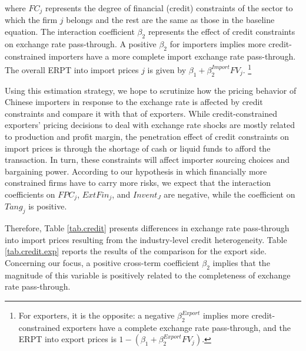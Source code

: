 where $FC_{j}$ represents the degree of financial (credit) constraints of the sector to which the firm $j$ belongs and the rest are the same as those in the baseline equation. The interaction coefficient $\beta_2$ represents the effect of credit constraints on exchange rate pass-through. A positive $\beta_2$ for importers implies more credit-constrained importers have a more complete import exchange rate pass-through. The overall ERPT into import prices $j$ is given by $\beta_{1} +\beta^{Import}_{2} FV_j$. \footnote{For exporters, it is the opposite: a negative $\beta^{Export}_2$ implies more credit-constrained exporters have a complete exchange rate pass-through, and the ERPT into export prices is $1-(\beta_{1} +\beta^{Export}_{2} FV_j)$.}

Using this estimation strategy, we hope to scrutinize how the pricing behavior of Chinese importers in response to the exchange rate is affected by credit constraints and compare it with that of exporters. While credit-constrained exporters’ pricing decisions to deal with exchange rate shocks are mostly related to production and profit margin, the penetration effect of credit constraints on import prices is through the shortage of cash or liquid funds to afford the transaction. In turn, these constraints will affect importer sourcing choices and bargaining power. According to our hypothesis in which financially more constrained firms have to carry more risks, we expect that the interaction coefficients on $FPC_{j}$, $ExtFin_j$, and $Invent_J$ are negative, while the coefficient on $Tang_j$ is positive.

Therefore, Table \ref{tab.credit} presents differences in exchange rate pass-through into import prices resulting from the industry-level credit heterogeneity. Table \ref{tab.credit.exp} reports the results of the comparison for the export side. Concerning our focus, a positive cross-term coefficient $\beta_2$ implies that the magnitude of this variable is positively related to the completeness of exchange rate pass-through.

